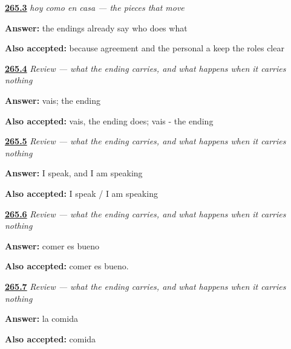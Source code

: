 \noindent\begin{minipage}[t]{\linewidth}
\raggedright
\hyperlink{review-ES-C67-hoy-como-en-casa-why}{\textbf{265.3}} \emph{hoy como en casa — the pieces that move}\par
\small \textbf{Answer:} the endings already say who does what\par
\footnotesize \textbf{Also accepted:} because agreement and the personal a keep the roles clear
\end{minipage}\par\medskip

\noindent\begin{minipage}[t]{\linewidth}
\raggedright
\hyperlink{review-ES-C67-repaso-la-terminacion-y-el-infinitivo-prodrop}{\textbf{265.4}} \emph{Review — what the ending carries, and what happens when it carries nothing}\par
\small \textbf{Answer:} vais; the ending\par
\footnotesize \textbf{Also accepted:} vais, the ending does; vais - the ending
\end{minipage}\par\medskip

\noindent\begin{minipage}[t]{\linewidth}
\raggedright
\hyperlink{review-ES-C67-repaso-la-terminacion-y-el-infinitivo-dos}{\textbf{265.5}} \emph{Review — what the ending carries, and what happens when it carries nothing}\par
\small \textbf{Answer:} I speak, and I am speaking\par
\footnotesize \textbf{Also accepted:} I speak / I am speaking
\end{minipage}\par\medskip

\noindent\begin{minipage}[t]{\linewidth}
\raggedright
\hyperlink{review-ES-C67-repaso-la-terminacion-y-el-infinitivo-sujeto}{\textbf{265.6}} \emph{Review — what the ending carries, and what happens when it carries nothing}\par
\small \textbf{Answer:} comer es bueno\par
\footnotesize \textbf{Also accepted:} comer es bueno.
\end{minipage}\par\medskip

\noindent\begin{minipage}[t]{\linewidth}
\raggedright
\hyperlink{review-ES-C67-repaso-la-terminacion-y-el-infinitivo-nombre}{\textbf{265.7}} \emph{Review — what the ending carries, and what happens when it carries nothing}\par
\small \textbf{Answer:} la comida\par
\footnotesize \textbf{Also accepted:} comida
\end{minipage}\par\medskip

